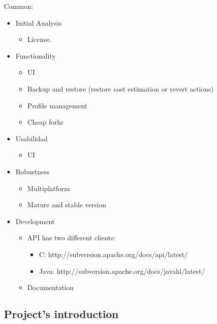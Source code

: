 \documentclass[11pt]{scrartcl}
\begin{document}
Common:
\begin{itemize}

    \item Initial Analysis
        \begin{itemize}
            \item License.
        \end{itemize}

    \item Functionality
        \begin{itemize}
            \item UI 
            \item Backup and restore (restore cost estimation or revert actions)
            \item Profile management
            \item Cheap forks
        \end{itemize}

    \item Usabilidad
        \begin{itemize}
            \item UI
        \end{itemize}
    
    \item Robustness
        \begin{itemize}
            \item Multiplatform
            \item Mature and stable version
        \end{itemize}

    \item Development
        \begin{itemize}
            \item API has two different clients:
            \begin{itemize}
                \item C: http://subversion.apache.org/docs/api/latest/ 
                \item Java: http://subversion.apache.org/docs/javahl/latest/
            \end{itemize}
            \item Documentation
        \end{itemize}

\end{itemize}


\subsection{Project's introduction}
\end{document}
